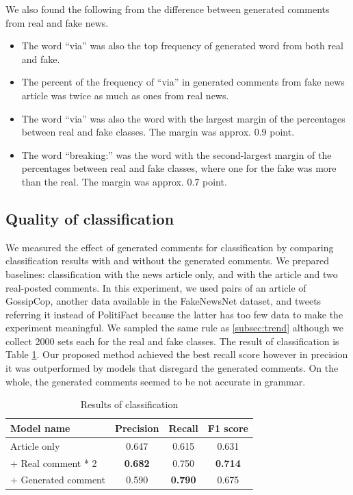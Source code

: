 \documentclass[conference]{IEEEtran}
\begin{document}
We also found the following from the difference between generated comments from real and fake news.
\begin{itemize}[]
    \item The word ``via'' was also the top frequency of generated word from both real and fake. 
    \item The percent of the frequency of ``via'' in generated comments from fake news article was twice as much as ones from real news.
    \item The word ``via'' was also the word with the largest margin of the percentages between real and fake classes. 
    The margin was approx. 0.9 point.
    \item The word ``breaking:'' was the word with the second-largest margin of the percentages between real and fake classes, 
    where one for the fake was more than the real. 
    The margin was approx. 0.7 point.
\end{itemize}

\subsection{Quality of classification}
We measured the effect of generated comments for classification by comparing classification results with and without the generated comments.
We prepared baselines: classification with the news article only, and with the article and two real-posted comments.
In this experiment, we used pairs of an article of
GossipCop, another data available in the FakeNewsNet dataset, and tweets referring it instead of PolitiFact because the latter has too few data to make the experiment meaningful.
We sampled the same rule as \ref{subsec:trend} although we collect 2000 sets each for the real and fake classes.
The result of classification is Table \ref{tbl:classify_results}.
Our proposed method achieved the best recall score however in precision it was outperformed by models that disregard the generated comments.
On the whole, the generated comments seemed to be not accurate in grammar.

\begin{table}[!t]
    \renewcommand{\arraystretch}{1.3}
    \caption{Results of classification}
    \label{tbl:classify_results}
    \centering
    \begin{tabular}{lccc}
        \hline
        Model name           & Precision & Recall & F1 score \\ \hline
        Article only         & 0.647     & 0.615  & 0.631    \\
        + Real comment * 2  & \textbf{0.682}     & 0.750  & \textbf{0.714}    \\
        + Generated comment & 0.590     & \textbf{0.790}  & 0.675    \\ \hline
    \end{tabular}
\end{table}
\end{document}
